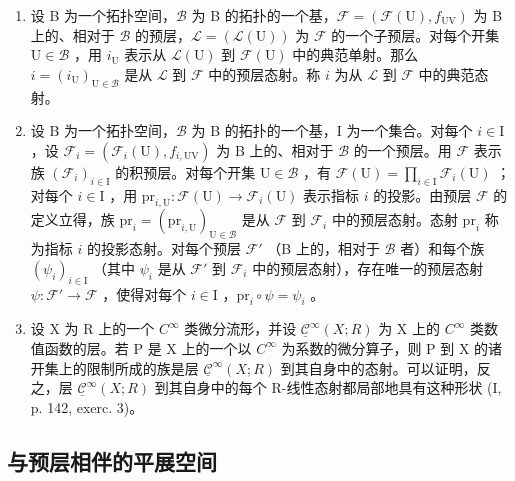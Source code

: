 \begin{enumerate}
\def\labelenumi{\arabic{enumi})}
\setcounter{enumi}{1}
\item
  设 B 为一个拓扑空间，\(\mathcal{B}\) 为 B 的拓扑的一个基，\(\mathcal{F} = (\mathcal{F}(\mathrm{U}), f_{\mathrm{UV}})\) 为 B 上的、相对于 \(\mathcal{B}\) 的预层，\(\mathcal{L} = (\mathcal{L}(\mathrm{U}))\) 为 \(\mathcal{F}\) 的一个子预层。对每个开集 \(\mathrm{U} \in \mathcal{B}\) ，用 \(i_{\mathrm{U}}\) 表示从 \(\mathcal{L}(\mathrm{U})\) 到 \(\mathcal{F}(\mathrm{U})\) 中的典范单射。那么 \(i = (i_{\mathrm{U}})_{\mathrm{U} \in \mathcal{B}}\) 是从 \(\mathcal{L}\) 到 \(\mathcal{F}\) 中的预层态射。称 \(i\) 为从 \(\mathcal{L}\) 到 \(\mathcal{F}\) 中的典范态射。
\item
  设 B 为一个拓扑空间，\(\mathcal{B}\) 为 B 的拓扑的一个基，I 为一个集合。对每个 \(i\in\mathrm{I}\) ，设 \(\mathcal{F}_{i}=(\mathcal{F}_{i}(\mathrm{U}),f_{i,\mathrm{UV}})\) 为 B 上的、相对于 \(\mathcal{B}\) 的一个预层。用 \(\mathcal{F}\) 表示族 \((\mathcal{F}_{i})_{i\in\mathrm{I}}\) 的积预层。对每个开集 \(\mathrm{U}\in\mathcal{B}\) ，有 \(\mathcal{F}(\mathrm{U})=\prod_{i\in\mathrm{I}}\mathcal{F}_{i}(\mathrm{U})\) ；对每个 \(i\in\mathrm{I}\) ，用 \(\mathrm{pr}_{i,\mathrm{U}}\colon\mathcal{F}(\mathrm{U})\to\mathcal{F}_{i}(\mathrm{U})\) 表示指标 \(i\) 的投影。由预层 \(\mathcal{F}\) 的定义立得，族 \(\mathrm{pr}_{i}=(\mathrm{pr}_{i,\mathrm{U}})_{\mathrm{U}\in\mathcal{B}}\) 是从 \(\mathcal{F}\) 到 \(\mathcal{F}_{i}\) 中的预层态射。态射 \(\mathrm{pr}_{i}\) 称为指标 \(i\) 的投影态射。对每个预层 \(\mathcal{F}'\) （B 上的，相对于 \(\mathcal{B}\) 者）和每个族 \((\psi_{i})_{i\in\mathrm{I}}\) （其中 \(\psi_{i}\) 是从 \(\mathcal{F}'\) 到 \(\mathcal{F}_{i}\) 中的预层态射），存在唯一的预层态射 \(\psi\colon\mathcal{F}'\to\mathcal{F}\) ，使得对每个 \(i\in\mathrm{I}\) ，\(\mathrm{pr}_{i}\circ\psi=\psi_{i}\) 。
\item
  设 X 为 R 上的一个 \(C^{\infty}\) 类微分流形，并设 \(\underline{\mathcal{C}}^{\infty}(X;R)\) 为 X 上的 \(C^{\infty}\) 类数值函数的层。若 P 是 X 上的一个以 \(C^{\infty}\) 为系数的微分算子，则 P 到 X 的诸开集上的限制所成的族是层 \(\underline{\mathcal{C}}^{\infty}(X;R)\) 到其自身中的态射。可以证明，反之，层 \(\underline{\mathcal{C}}^{\infty}(X;R)\) 到其自身中的每个 R-线性态射都局部地具有这种形状 (I, p. 142, exerc. 3)。
\end{enumerate}

\subsection{与预层相伴的平展空间}

